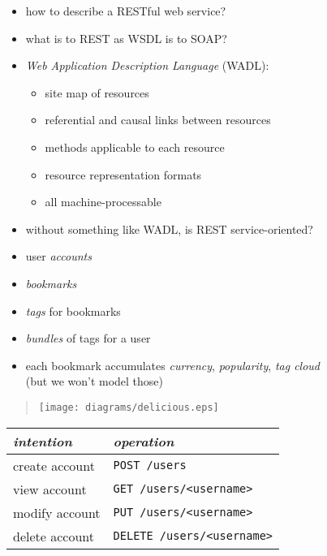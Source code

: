 \documentclass{sepslide-soa-faked} %
\begin{document}
\begin{slide}
\begin{itemize}
\item how to describe a RESTful web service?
\item what is to REST as WSDL is to SOAP?
\item \emph{Web Application Description Language} (WADL):
  \begin{itemize}
  \item site map of resources
  \item referential and causal links between resources
  \item methods applicable to each resource
  \item resource representation formats
  \item all machine-processable
  \end{itemize}
\item without something like WADL, is REST service-oriented?
\end{itemize}
\end{slide}

\begin{slide}
\begin{itemize}
\item user \emph{accounts}
\item \emph{bookmarks}
\item \emph{tags} for bookmarks
\item \emph{bundles} of tags for a user
\medskip
\item each bookmark accumulates \emph{currency}, \emph{popularity}, \emph{tag cloud} \\
  (but we won't model those)
\end{itemize}
\end{slide}

\begin{slide}
\begin{quote}
\texttt{[image: diagrams/delicious.eps]}
\end{quote}
\end{slide}

\begin{slide}
\begin{flushleft}
\begin{tabular}{@{}ll@{}}
\textit{intention} & \textit{operation} \\ \hline
create account & \verb"POST /users" \\
view account & \verb"GET /users/<username>" \\
modify account & \verb"PUT /users/<username>" \\
delete account & \verb"DELETE /users/<username>" 
\end{tabular}
\end{flushleft}
\end{slide}
\end{document}
